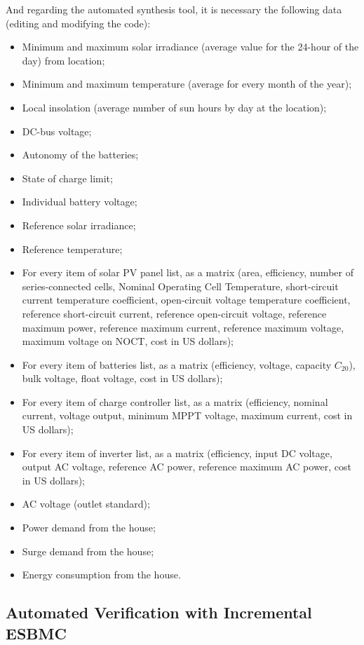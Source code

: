 And regarding the automated synthesis tool, it is necessary the following data (editing and modifying the code):

\begin{itemize}
\item Minimum and maximum solar irradiance (average value for the 24-hour of the day) from location;
\item Minimum and maximum temperature (average for every month of the year);
\item Local insolation (average number of sun hours by day at the location);
\item DC-bus voltage;
\item Autonomy of the batteries;
\item State of charge limit;
\item Individual battery voltage;
\item Reference solar irradiance;
\item Reference temperature;
\item For every item of solar PV panel list, as a matrix (area, efficiency, number of series-connected cells, Nominal Operating Cell Temperature, short-circuit current temperature coefficient, open-circuit voltage temperature coefficient, reference short-circuit current, reference open-circuit voltage, reference maximum power, reference maximum current, reference maximum voltage, maximum voltage on NOCT, cost in US dollars);
\item For every item of batteries list, as a matrix (efficiency, voltage, capacity $C_{20}$), bulk voltage, float voltage, cost in US dollars);
\item For every item of charge controller list, as a matrix (efficiency, nominal current, voltage  output, minimum MPPT voltage, maximum current, cost in US dollars);
\item For every item of inverter list, as a matrix (efficiency, input DC voltage, output AC voltage, reference AC power, reference maximum AC power, cost in US dollars);
\item AC voltage (outlet standard);
\item Power demand from the house;
\item Surge demand from the house;
\item Energy consumption from the house.
\end{itemize}


\subsection{Automated Verification with Incremental ESBMC}

